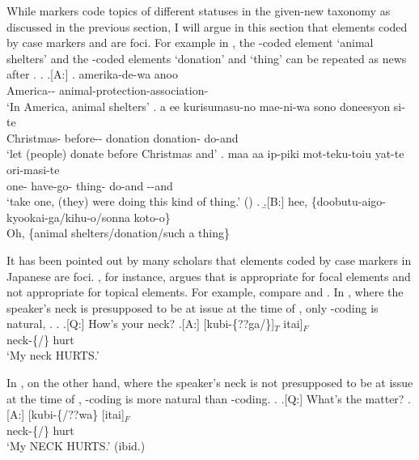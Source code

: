 While  markers code topics of different statuses in the given-new taxonomy as discussed in the previous section,
I will argue in this section that
elements coded by case markers  and  are foci.
For example in \Next,
the -coded element  `animal shelters' and
the -coded elements  `donation' and  `thing'
can be repeated as news after .
%
\ex.
 \a.[A:]
 \ag. amerika-de-wa anoo  \\
   America--  animal-protection-association- \\
   `In America, animal shelters'
  \bg. a ee kurisumasu-no mae-ni-wa sono doneesyon  si-te \\
     Christmas- before--  donation donation- do-and \\
   `let (people) donate before Christmas and'
  \bg. maa aa ip-piki mot-teku-toiu  yat-te ori-masi-te \\
     one- have-go- thing- do-and --and \\
   `take one, (they) were doing this kind of thing.'
   \hfill{()}
  \z.
  \b.[B:] hee, \{doobutu-aigo-kyookai-ga/kihu-o/sonna koto-o\} \\
   Oh, \{animal shelters/donation/such a thing\}
%

It has been pointed out by many scholars that
elements coded by case markers in Japanese are foci.
, for instance, argues that  is appropriate for focal elements
and not appropriate for topical elements.
For example,
compare \Next and \NNext.
In \Next,
where the speaker's neck is presupposed to be at issue at the time of  \Next[A],
only -coding is natural,
.
%
\ex. \a.[Q:] How's your neck?
	\bg.[A:] [kubi-\{??ga/\}]$_{T}$ itai]$_{F}$ \\
			neck-\{/\} hurt \\
			`My neck HURTS.' \hfill{}

In \Next,
on the other hand,
where the speaker's neck is not presupposed to be at issue at the time of  \Next[A],
-coding is more natural than -coding.
\ex. \a.[Q:] What's the matter?
	\bg.[A:] [kubi-\{/??wa\} [itai]$_{F}$ \\
			neck-\{/\} hurt \\
			`My NECK HURTS.' \hfill{(ibid.)}


